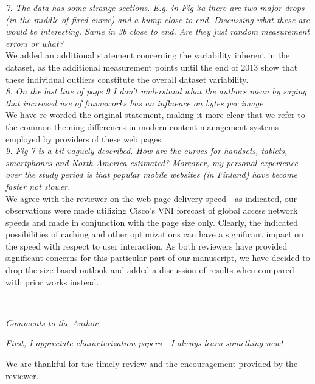 \documentclass[11pt, draftclsnofoot, onecolumn]{IEEEtran}
\begin{document}
{{\noindent \textit{7. The data has some strange sections. E.g. in Fig 3a there are two major drops (in the middle of fixed curve) and a bump close to end. Discussing what these are would be interesting. Same in 3b close to end. Are they just random measurement errors or what?}\\
We added an additional statement concerning the variability inherent in the dataset, as the additional measurement points until the end of 2013 show that these individual outliers constitute the overall dataset variability.\\

\noindent \textit{8. On the last line of page 9 I don't understand what the authors mean by saying that increased use of frameworks has an influence on bytes per image}\\
We have re-worded the original statement, making it more clear that we refer to the common theming differences in modern content management systems employed by providers of these web pages.\\


\noindent \textit{9. Fig 7 is a bit vaguely described. How are the curves for handsets, tablets, smartphones and North America estimated? Moreover, my personal experience over the study period is that popular mobile websites (in Finland) have become faster not slower.}\\
We agree with the reviewer on the web page delivery speed - as indicated, our observations were made utilizing Cisco's VNI forecast of global access network speeds and made in conjunction with the page size only. Clearly, the indicated possibilities of caching and other optimizations can have a significant impact on the speed with respect to user interaction. 
As both reviewers have provided significant concerns for this particular part of our manuscript, we have decided to drop the size-based outlook and added a discussion of results when compared with prior works instead.





~\\


\noindent \textit{Comments to the Author}



\noindent \textit{First, I appreciate characterization papers - I always learn something new!}

We are thankful for the timely review and the encouragement provided by the reviewer.
\\

}}
\end{document}
